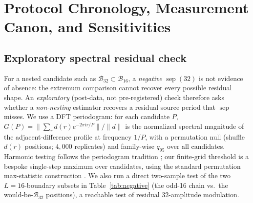 \documentclass{article}
\begin{document}
\label{p5:main-text-end}



\appendix
\section{Protocol Chronology, Measurement Canon, and Sensitivities}\label{app:protocol}

\subsection{Exploratory spectral residual check}\label{sec:nonnest}

For a nested candidate such as
$\mathcal B_{32}\subset\mathcal B_{16}$, a \emph{negative}
$\operatorname{sep}(32)$ is not evidence of absence: the extremum comparison
cannot recover every possible residual shape. An \emph{exploratory} (post-data,
not pre-registered) check therefore asks whether a \emph{non-nesting} estimator
recovers a residual source period that $\operatorname{sep}$ misses. We use a DFT
periodogram: for each candidate $P$,
$G(P)=\lVert\sum_r d(r)e^{-2\pi i r/P}\rVert/\lVert d\rVert$ is the normalized
spectral magnitude of the adjacent-difference profile at frequency $1/P$, with a
permutation null (shuffle $d(r)$ positions; $4{,}000$ replicates) and family-wise
$q_\mathrm{95}$ over all candidates. Harmonic testing follows the periodogram
tradition \citep{fisher1929harmonic}; our finite-grid threshold is a bespoke
single-step maximum over candidates, using the standard permutation max-statistic
construction \citep{nichols2002permutation}. We also run a direct two-sample test
of the two $L{=}16$-boundary subsets in Table~\ref{tab:negative} (the odd-16 chain
vs.\ the would-be-$\mathcal B_{32}$ positions), a reachable test of residual
$32$-amplitude modulation.
\end{document}
